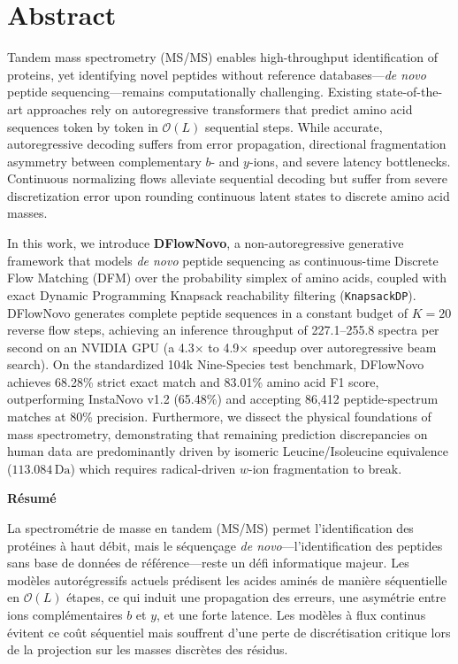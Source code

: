 \chapter*{Abstract} 

Tandem mass spectrometry (MS/MS) enables high-throughput identification of proteins, yet identifying novel peptides without reference databases---\emph{de novo} peptide sequencing---remains computationally challenging. Existing state-of-the-art approaches rely on autoregressive transformers that predict amino acid sequences token by token in $\mathcal{O}(L)$ sequential steps. While accurate, autoregressive decoding suffers from error propagation, directional fragmentation asymmetry between complementary $b$- and $y$-ions, and severe latency bottlenecks. Continuous normalizing flows alleviate sequential decoding but suffer from severe discretization error upon rounding continuous latent states to discrete amino acid masses. 

In this work, we introduce \textbf{DFlowNovo}, a non-autoregressive generative framework that models \emph{de novo} peptide sequencing as continuous-time Discrete Flow Matching (DFM) over the probability simplex of amino acids, coupled with exact Dynamic Programming Knapsack reachability filtering (\texttt{KnapsackDP}). DFlowNovo generates complete peptide sequences in a constant budget of $K=20$ reverse flow steps, achieving an inference throughput of 227.1--255.8 spectra per second on an NVIDIA GPU (a 4.3$\times$ to 4.9$\times$ speedup over autoregressive beam search). On the standardized 104k Nine-Species test benchmark, DFlowNovo achieves 68.28\% strict exact match and 83.01\% amino acid F1 score, outperforming InstaNovo v1.2 (65.48\%) and accepting 86,412 peptide-spectrum matches at 80\% precision. Furthermore, we dissect the physical foundations of mass spectrometry, demonstrating that remaining prediction discrepancies on human data are predominantly driven by isomeric Leucine/Isoleucine equivalence ($113.084\,\text{Da}$) which requires radical-driven $w$-ion fragmentation to break.

\bigskip
\begin{center}
\textbf{R\'esum\'e}
\end{center}

La spectrom\'etrie de masse en tandem (MS/MS) permet l'identification des prot\'eines \`a haut d\'ebit, mais le s\'equen\c{c}age \emph{de novo}---l'identification des peptides sans base de donn\'ees de r\'ef\'erence---reste un d\'efi informatique majeur. Les mod\`eles autor\'egressifs actuels pr\'edisent les acides amin\'es de mani\`ere s\'equentielle en $\mathcal{O}(L)$ \'etapes, ce qui induit une propagation des erreurs, une asym\'etrie entre ions compl\'ementaires $b$ et $y$, et une forte latence. Les mod\`eles \`a flux continus \'evitent ce co\^ut s\'equentiel mais souffrent d'une perte de discr\'etisation critique lors de la projection sur les masses discr\`etes des r\'esidus.

